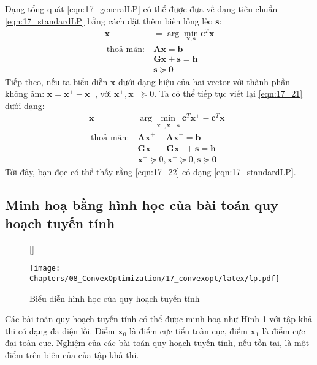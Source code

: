 Dạng tổng quát \eqref{eqn:17_generalLP} có thể được đưa về dạng tiêu chuẩn
\eqref{eqn:17_standardLP} bằng cách đặt thêm biến lỏng lẻo $\mathbf{s}$:
\begin{equation}
\label{eqn:17_21}
\begin{aligned}
\mathbf{x} &= \arg\min_{\mathbf{x}, \mathbf{s}} \mathbf{c}^T\mathbf{x} \\\
\text{thoả mãn:}~ & \mathbf{Ax} = \mathbf{b}\\\
& \mathbf{Gx} + \mathbf{s} = \mathbf{h} \\\
& \mathbf{s} \succeq \mathbf{0}
\end{aligned}
\end{equation}
Tiếp theo, nếu ta biểu diễn $\mathbf{x}$ dưới dạng hiệu của hai vector với thành
phần không âm: $\mathbf{x} = \mathbf{x}^+ - \mathbf{x}^-$, với
$\mathbf{x}^+, \mathbf{x}^- \succeq 0$. Ta có thể tiếp tục viết lại
\eqref{eqn:17_21} dưới dạng:
\begin{equation}
\label{eqn:17_22}
\begin{aligned}
\mathbf{x} =& \arg\min_{\mathbf{x}^+,\mathbf{x}^-, \mathbf{s}} \mathbf{c}^T\mathbf{x}^+ - \mathbf{c}^T\mathbf{x}^- \\\
\text{thoả mãn:}~ & \mathbf{Ax}^+ - \mathbf{Ax}^- = \mathbf{b} \\\
& \mathbf{Gx}^+ - \mathbf{Gx}^- + \mathbf{s} = \mathbf{h} \\\
& \mathbf{x}^+ \succeq 0, \mathbf{x}^- \succeq 0, \mathbf{s} \succeq \mathbf{0}
\end{aligned}
\end{equation}
Tới đây, bạn đọc có thể thấy rằng \eqref{eqn:17_22} có dạng
\eqref{eqn:17_standardLP}.


\subsection{Minh hoạ bằng hình học của bài toán quy hoạch tuyến tính}

\begin{figure}[t]
[\FBwidth]
{\caption{Biểu diễn hình học của quy hoạch tuyến tính}
\label{fig:17_lp}}
{\texttt{[image: Chapters/08\_ConvexOptimization/17\_convexopt/latex/lp.pdf]}}
\end{figure}

Các bài toán quy hoạch tuyến tính có thể được minh hoạ như Hình \ref{fig:17_lp} với tập khả thi có dạng đa diện lồi. Điểm
$\mathbf{x}_0$ là điểm cực tiểu toàn cục, điểm
$\mathbf{x}_1$ là điểm cực đại toàn cục. Nghiệm
của các bài toán quy hoạch tuyến tính, nếu tồn tại, là một điểm trên biên của của tập khả thi.

